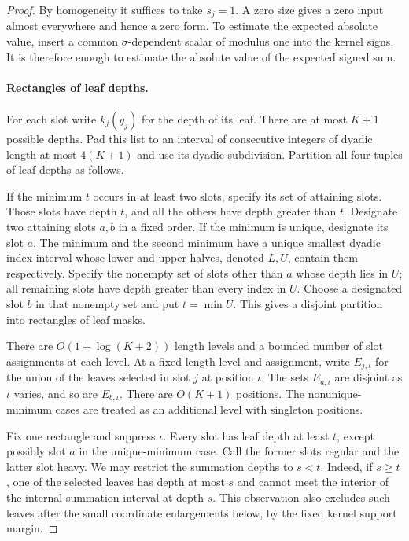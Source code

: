 \begin{proof}
By homogeneity it suffices to take $s_j=1$.  A zero size gives a zero
input almost everywhere and hence a zero form.  To estimate the expected
absolute value, insert a common $\sigma$-dependent scalar of modulus
one into the kernel signs.  It is therefore enough to estimate the
absolute value of the expected signed sum.

\paragraph{Rectangles of leaf depths.}
For each slot write $k_j(y_j)$ for the depth of its leaf.  There are at
most $K+1$ possible depths.  Pad this list to an interval of consecutive
integers of dyadic length at most $4(K+1)$ and use its dyadic
subdivision.  Partition all four-tuples of leaf depths as follows.

If the minimum $t$ occurs in at least two slots, specify its set of
attaining slots.  Those slots have depth $t$, and all the others have
depth greater than $t$.  Designate two attaining slots $a,b$ in a fixed
order.  If the minimum is unique, designate its slot $a$.  The minimum
and the second minimum have a unique smallest dyadic index interval
whose lower and upper halves, denoted $L,U$, contain them respectively.
Specify the nonempty set of slots other than $a$ whose depth lies in
$U$; all remaining slots have depth greater than every index in $U$.
Choose a designated slot $b$ in that nonempty set and put $t=\min U$.
This gives a disjoint partition into rectangles of leaf masks.

There are $O(1+\log(K+2))$ length levels and a bounded number of slot
assignments at each level.  At a fixed length level and assignment,
write $E_{j,\iota}$ for the union of the leaves selected in slot $j$
at position $\iota$.  The sets $E_{a,\iota}$ are disjoint as $\iota$
varies, and so are $E_{b,\iota}$.  There are $O(K+1)$ positions.
The nonunique-minimum cases are treated as an additional level with
singleton positions.

Fix one rectangle and suppress $\iota$.  Every slot has leaf depth at
least $t$, except possibly slot $a$ in the unique-minimum case.  Call
the former slots regular and the latter slot heavy.  We may restrict
the summation depths to $s<t$.  Indeed, if $s\ge t$, one of the selected
leaves has depth at most $s$ and cannot meet the interior of the
internal summation interval at depth $s$.  This observation also
excludes such leaves after the small coordinate enlargements below,
by the fixed kernel support margin.


\end{proof}
